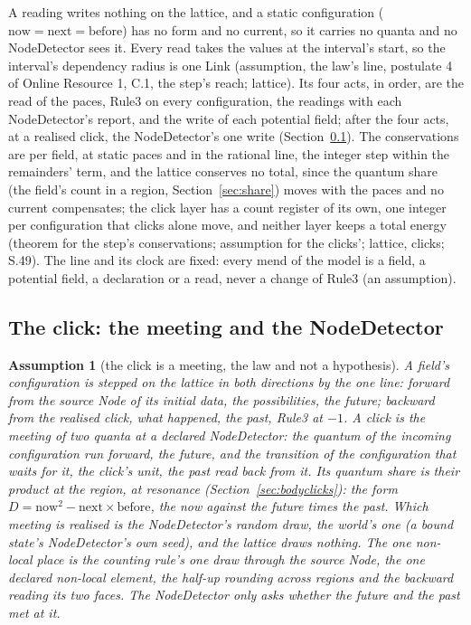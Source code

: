 \documentclass[pdflatex,sn-mathphys-num]{sn-jnl}
\theoremstyle{thmstyleone}
\theoremstyle{thmstyletwo}
\newtheorem{assumption}{Assumption}
\begin{document}
A reading writes nothing on the lattice, and a static configuration ($\mathrm{now} = \mathrm{next} = \mathrm{before}$) has no form and no current, so it carries no quanta and no NodeDetector sees it. Every read takes the values at the interval's start, so the interval's dependency radius is one Link (assumption, the law's line, postulate 4 of Online Resource 1, C.1, the step's reach; lattice). Its four acts, in order, are the read of the paces, Rule3 on every configuration, the readings with each NodeDetector's report, and the write of each potential field; after the four acts, at a realised click, the NodeDetector's one write (Section~\ref{sec:click}). The conservations are per field, at static paces and in the rational line, the integer step within the remainders' term, and the lattice conserves no total, since the quantum share (the field's count in a region, Section~\ref{sec:share}) moves with the paces and no current compensates; the click layer has a count register of its own, one integer per configuration that clicks alone move, and neither layer keeps a total energy (theorem for the step's conservations; assumption for the clicks'; lattice, clicks; S.49). The line and its clock are fixed: every mend of the model is a field, a potential field, a declaration or a read, never a change of Rule3 (an assumption).

\subsection{The click: the meeting and the NodeDetector}\label{sec:click}

\begin{assumption}[the click is a meeting, the law and not a hypothesis]\label{as:meeting}
A field's configuration is stepped on the lattice in both directions by the one line: forward from the source Node of its initial data, the possibilities, the future; backward from the realised click, what happened, the past, Rule3 at $-1$. A click is the meeting of two quanta at a declared NodeDetector: the quantum of the incoming configuration run forward, the future, and the transition of the configuration that waits for it, the click's unit, the past read back from it. Its quantum share is their product at the region, at resonance (Section~\ref{sec:bodyclicks}): the form $D = \mathrm{now}^2 - \mathrm{next} \times \mathrm{before}$, the now against the future times the past. Which meeting is realised is the NodeDetector's random draw, the world's one (a bound state's NodeDetector's own seed), and the lattice draws nothing. The one non-local place is the counting rule's one draw through the source Node, the one declared non-local element, the half-up rounding across regions and the backward reading its two faces. The NodeDetector only asks whether the future and the past met at it.
\end{assumption}
\end{document}
